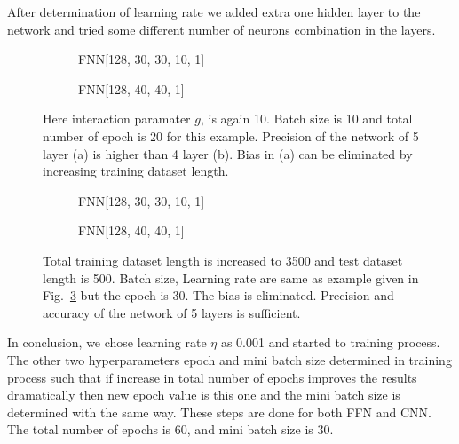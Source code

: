 \documentclass[a4paper,times,12pt]{article}
\begin{document}
After determination of learning rate we added extra one hidden layer to the network and tried some different number of neurons combination in the layers.

\begin{figure}[H]
    \centering
    \begin{subfigure}[t]{0.45\textwidth}
           \centering
            
            \caption{FNN[128, 30, 30, 10, 1]}
            \label{fig:a}
    \end{subfigure}\hfill
    \begin{subfigure}[t]{0.45\textwidth}
            \centering
             
            \caption{FNN[128, 40, 40, 1]}
            \label{fig:b}
    \end{subfigure}
    \caption{Here interaction paramater $g$, is again 10. Batch size is 10 and total number of epoch is 20 for this example. Precision of the network of 5 layer (a) is higher than 4 layer (b). Bias in (a) can be eliminated by increasing training dataset length.}
\label{fig:network_layer_increment}
\end{figure}

\begin{figure}[H]
    \centering
    \begin{subfigure}[t]{0.45\textwidth}
		\centering
        
        \caption{FNN[128, 30, 30, 10, 1]}
		\label{fig:a}
    \end{subfigure}\hfill
    \begin{subfigure}[t]{0.45\textwidth}
        \centering
        
        \caption{FNN[128, 40, 40, 1]}
		\label{fig:b}
    \end{subfigure}
    \caption{Total training dataset length is increased to 3500 and test dataset length is 500. Batch size, Learning rate are same as example given in Fig.~\ref{fig:network_layer_increment} but the epoch is 30. The bias is eliminated. Precision and accuracy of the network of 5 layers is sufficient.}
\end{figure}

In conclusion, we chose learning rate $\eta$ as 0.001 and started to training process. The other two hyperparameters epoch and mini batch size determined in training process such that if increase in total number of epochs improves the results dramatically then new epoch value is this one and the mini batch size is determined with the same way. These steps are done for both FFN and CNN. The total number of epochs is 60, and mini batch size is 30. 
\end{document}
